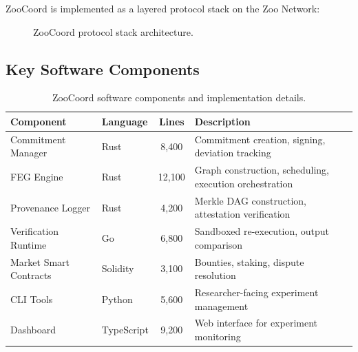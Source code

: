 \documentclass[11pt,a4paper]{article}
\begin{document}
ZooCoord is implemented as a layered protocol stack on the Zoo Network:

\begin{figure}[H]
\centering
{}
\caption{ZooCoord protocol stack architecture.}
\label{fig:stack}
\end{figure}

\subsection{Key Software Components}

\begin{table}[H]
\centering
\caption{ZooCoord software components and implementation details.}
\label{tab:components}
\begin{tabularx}{\textwidth}{@{}llcX@{}}
\toprule
\textbf{Component} & \textbf{Language} & \textbf{Lines} & \textbf{Description} \\
\midrule
Commitment Manager & Rust & 8,400 & Commitment creation, signing, deviation tracking \\
FEG Engine & Rust & 12,100 & Graph construction, scheduling, execution orchestration \\
Provenance Logger & Rust & 4,200 & Merkle DAG construction, attestation verification \\
Verification Runtime & Go & 6,800 & Sandboxed re-execution, output comparison \\
Market Smart Contracts & Solidity & 3,100 & Bounties, staking, dispute resolution \\
CLI Tools & Python & 5,600 & Researcher-facing experiment management \\
Dashboard & TypeScript & 9,200 & Web interface for experiment monitoring \\
\bottomrule
\end{tabularx}
\end{table}
\end{document}
